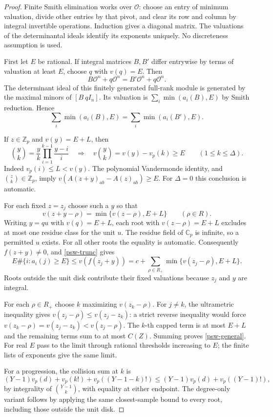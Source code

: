 \begin{proof}
Finite Smith elimination works over $\mathcal O$: choose an entry
of minimum valuation, divide other entries by that pivot, and clear
its row and column by integral invertible operations.  Induction
gives a diagonal matrix.  The valuations of the determinantal ideals
identify its exponents uniquely.  No discreteness assumption is used.

First let $E$ be rational.  If integral matrices $B,B'$ differ
entrywise by terms of valuation at least $E$, choose $q$ with
$v(q)=E$.  Then
\[
 B\mathcal O^n+q\mathcal O^n=B'\mathcal O^n+q\mathcal O^n.
\]
The determinant ideal of this finitely generated full-rank module
is generated by the maximal minors of $[B\ qI_n]$.  Its valuation
is $\sum_i\min(a_i(B),E)$ by Smith reduction.  Hence
\begin{equation}\label{psw-trunc}
 \sum_i\min(a_i(B),E)=\sum_i\min(a_i(B'),E).
\end{equation}

If $z\in\mathbb Z_p$ and $v(y)=E+L$, then
\[
 \binom yk=\frac yk\prod_{i=1}^{k-1}\frac{y-i}{i}
 \quad\Longrightarrow\quad
 v\binom yk=v(y)-v_p(k)\ge E\qquad(1\le k\le\Delta).
\]
Indeed $v_p(i)\le L<v(y)$.  The polynomial Vandermonde identity,
and $\binom zk\in\mathbb Z_p$, imply
$v(A(z+y)_{ab}-A(z)_{ab})\ge E$.  For $\Delta=0$ this
conclusion is automatic.

For each fixed $z=z_j$ choose such a $y$ so that
\[
 v(z+y-\rho)=\min\{v(z-\rho),E+L\}\qquad(\rho\in R).
\]
Writing $y=qu$ with $v(q)=E+L$, each root with
$v(z-\rho)=E+L$ excludes at most one residue class for the
unit $u$.  The residue field of $\mathbb C_p$ is infinite, so a
permitted $u$ exists.  For all other roots the equality is automatic.
Consequently $f(z+y)\ne0$, and \eqref{psw-trunc} gives
\[
 E\#\{i:a_i(j)\ge E\}
 \le v(f(z_j+y))
 =c+\sum_{\rho\in R_+}\min\{v(z_j-\rho),E+L\}.
\]
Roots outside the unit disk contribute their fixed valuations
because $z_j$ and $y$ are integral.

For each $\rho\in R_+$ choose $k$ maximizing $v(z_k-\rho)$.
For $j\ne k$, the ultrametric inequality gives
$v(z_j-\rho)\le v(z_j-z_k)$: a strict reverse inequality would
force $v(z_k-\rho)=v(z_j-z_k)<v(z_j-\rho)$.
The $k$-th capped term is at most $E+L$ and the remaining terms
sum to at most $C(Z)$.  Summing proves \eqref{psw-general}.
For real $E$ pass to the limit through rational thresholds
increasing to $E$; the finite lists of exponents give the same limit.

For a progression, the collision sum at $k$ is
\[
 (Y-1)v_p(d)+v_p(k!)+v_p((Y-1-k)!)
 \le (Y-1)v_p(d)+v_p((Y-1)!),
\]
by integrality of $\binom{Y-1}k$, with equality at either endpoint.
The degree-only variant follows by applying the same closest-sample
bound to every root, including those outside the unit disk.
\end{proof}

